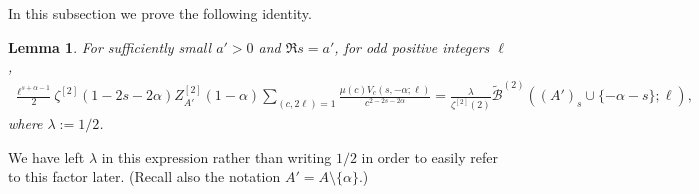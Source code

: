 \documentclass[12pt]{amsart}
\newtheorem{lemma}{Lemma}
\begin{document}
	In this subsection we prove the following identity.
	
	\begin{lemma}
		\label{lem:matching_eulers}
		For sufficiently small $a'> 0$ and $\Re s = a'$, for odd positive integers $\ell$,
		\begin{multline}
			\label{eq:matching_eulers}
			\frac{\ell^{s+\alpha-1}}{2} \zeta^{[2]}(1-2s-2\alpha) Z_{A'}^{[2]}(1-\alpha) \sum_{(c,2\ell)=1} \frac{\mu(c) V_c(s,-\alpha;\ell)}{c^{2-2s-2\alpha}} =  \frac{\lambda}{\zeta^{[2]}(2)} \tilde{\mathcal{B}}^{(2)}((A')_s \cup \{-\alpha-s\};\ell),
		\end{multline}
		where $\lambda := 1/2$. 
	\end{lemma}
	
	We have left $\lambda$ in this expression rather than writing $1/2$ in order to easily refer to this factor later. (Recall also the notation $A' = A \setminus \{\alpha\}$.)
	
\end{document}
